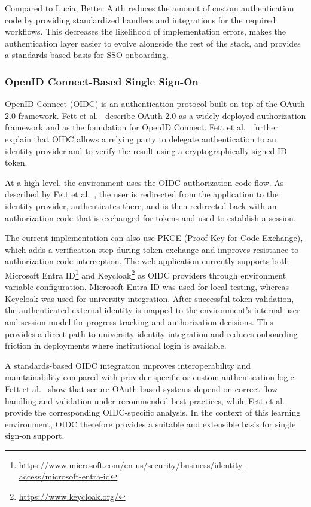 Compared to Lucia, Better Auth reduces the amount of custom authentication code by providing standardized handlers and integrations for the required workflows.
This decreases the likelihood of implementation errors, makes the authentication layer easier to evolve alongside the rest of the stack, and provides a standards-based basis for SSO onboarding.

\subsubsection{OpenID Connect-Based Single Sign-On} \label{subsubsec:openid-connect-based-single-sign-on}
OpenID Connect (OIDC) is an authentication protocol built on top of the OAuth 2.0 framework.
Fett et al.~\cite{fett_comprehensive_2016} describe OAuth 2.0 as a widely deployed authorization framework and as the foundation for OpenID Connect.
Fett et al.~\cite{fett_web_2017} further explain that OIDC allows a relying party to delegate authentication to an identity provider and to verify the result using a cryptographically signed ID token.

At a high level, the environment uses the OIDC authorization code flow.
As described by Fett et al.~\cite{fett_web_2017}, the user is redirected from the application to the identity provider, authenticates there, and is then redirected back with an authorization code that is exchanged for tokens and used to establish a session.

The current implementation can also use PKCE (Proof Key for Code Exchange), which adds a verification step during token exchange and improves resistance to authorization code interception.
The web application currently supports both Microsoft Entra ID\footnote{\url{https://www.microsoft.com/en-us/security/business/identity-access/microsoft-entra-id}} and Keycloak\footnote{\url{https://www.keycloak.org/}} as OIDC providers through environment variable configuration.
Microsoft Entra ID was used for local testing, whereas Keycloak was used for university integration.
After successful token validation, the authenticated external identity is mapped to the environment's internal user and session model for progress tracking and authorization decisions.
This provides a direct path to university identity integration and reduces onboarding friction in deployments where institutional login is available.

A standards-based OIDC integration improves interoperability and maintainability compared with provider-specific or custom authentication logic.
Fett et al.~\cite{fett_comprehensive_2016} show that secure OAuth-based systems depend on correct flow handling and validation under recommended best practices, while Fett et al.~\cite{fett_web_2017} provide the corresponding OIDC-specific analysis.
In the context of this learning environment, OIDC therefore provides a suitable and extensible basis for single sign-on support.

